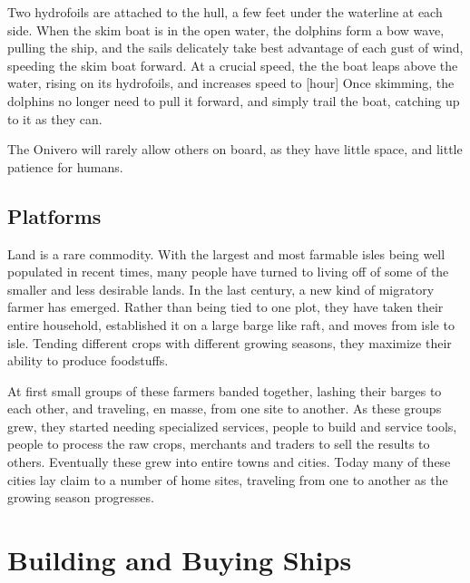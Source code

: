 \begin{multicols*}{2}
Two hydrofoils are attached to the hull, a few feet under the waterline at each side. When the skim boat is in the open water, the dolphins form a bow wave, pulling the ship,
and the sails delicately take best advantage of each gust of wind, speeding the skim boat forward. At a crucial speed, the the boat leaps above the water, rising on its hydrofoils, and increases speed to [hour] Once skimming, the dolphins no longer need to pull it forward, and simply trail the boat, catching up to it as they can.

The Onivero will rarely allow others on board, as they have little space, and little patience for humans.
\subsection{Platforms}
Land is a rare commodity. With the largest and most farmable isles being well populated in recent times, many people have turned to living off of some of the smaller
and less desirable lands. In the last century, a new kind of migratory farmer has emerged. Rather than being tied to one plot, they have taken their entire household, established it on a large barge like raft, and moves from isle to isle. Tending different crops with different growing seasons, they maximize their ability to produce foodstuffs.

At first small groups of these farmers banded together, lashing their barges to each other, and traveling, en masse, from one site to another. As these groups grew, they
started needing specialized services, people to build and service tools, people to process the raw crops, merchants and traders to sell the results to others. Eventually these grew into entire towns and cities. Today many of these cities lay claim to a number of home sites, traveling from one to another as the growing season progresses.
\section{Building and Buying Ships}

\end{multicols*}
